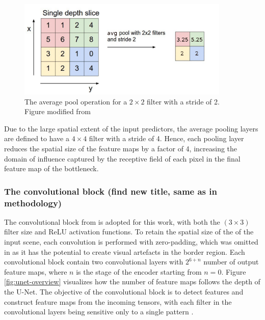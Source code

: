 \documentclass[../main/thesis]{subfiles}
\begin{document}
\begin{figure}
    \centering
    \includegraphics[width=0.9\textwidth]{The-AvgPool-operation.png}
    \caption{\label{fig:avgpool}The average pool operation for a $2 \times 2$ filter with a stride of 2. Figure modified from \protect\citep{MihaiDaniel2020}}
\end{figure}

Due to the large spatial extent of the input predictors, the average pooling layers are defined to have a $4 \times 4$ filter with a stride of 4. Hence, each pooling layer reduces the spatial size of the feature maps by a factor of 4, increasing the domain of influence captured by the receptive field of each pixel in the final feature map of the bottleneck.

\subsubsection{The convolutional block (find new title, same as in methodology)}
The convolutional block from \citet{Ronneberger2015} is adopted for this work, with both the $(3 \times 3)$ filter size and ReLU \citep{Nair2010} activation functions. To retain the spatial size of the of the input scene, each convolution is performed with zero-padding, which was omitted in \citet{Ronneberger2015} as it has the potential to create visual artefacts in the border region. Each convolutional block contain two convolutional layers with $2^{6 + n}$ number of output feature maps, where $n$ is the stage of the encoder starting from $n = 0$. Figure \ref{fig:unet-overview} visualizes how the number of feature maps follows the depth of the U-Net. The objective of the convolutional block is to detect features and construct feature maps from the incoming tensors, with each filter in the convolutional layers being sensitive only to a single pattern \citep{Fukushima1980}.
\end{document}
